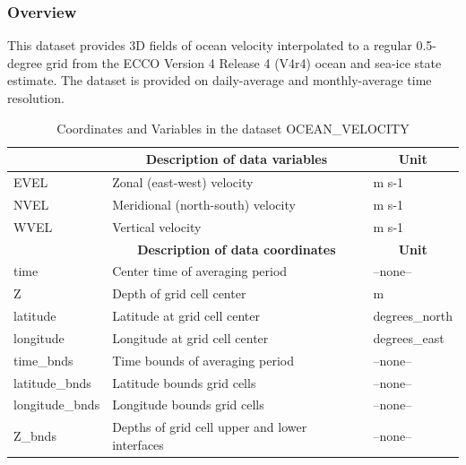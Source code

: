 \subsubsection{Overview}
This dataset provides 3D fields of ocean velocity interpolated to a regular 0.5-degree grid from the ECCO Version 4 Release 4 (V4r4) ocean and sea-ice state estimate. The dataset is provided on daily-average and monthly-average time resolution. 
\begin{longtable}{|m{}|m{}|m{}|}
\caption{Coordinates and Variables in the dataset OCEAN\_VELOCITY}
\label{tab:table-OCEAN_VELOCITY-fields} \\ 
\hline \endhead \hline \endfoot
\rowcolor{lightgray} \multicolumn{1}{|c|}{\textbf{Variables}} & \multicolumn{1}{|c|}{\textbf{Description of data variables}} &  \multicolumn{1}{|c|}{\textbf{Unit}}\\ \hline
EVEL &Zonal (east-west) velocity &m s-1  \\ \hline
NVEL &Meridional (north-south) velocity &m s-1  \\ \hline
WVEL &Vertical velocity &m s-1  \\ \hline
\rowcolor{lightgray} \multicolumn{1}{|c|}{\textbf{Coordinates}} & \multicolumn{1}{|c|}{\textbf{Description of data coordinates}} &  \multicolumn{1}{|c|}{\textbf{Unit}}\\ \hline
time &Center time of averaging period &--none--  \\ \hline
Z &Depth of grid cell center &m  \\ \hline
latitude &Latitude at grid cell center &degrees\_north  \\ \hline
longitude &Longitude at grid cell center &degrees\_east  \\ \hline
time\_bnds &Time bounds of averaging period &--none--  \\ \hline
latitude\_bnds &Latitude bounds grid cells &--none--  \\ \hline
longitude\_bnds &Longitude bounds grid cells &--none--  \\ \hline
Z\_bnds &Depths of grid cell upper and lower interfaces &--none--  \\ \hline
\end{longtable}

\newp
\pagebreak
